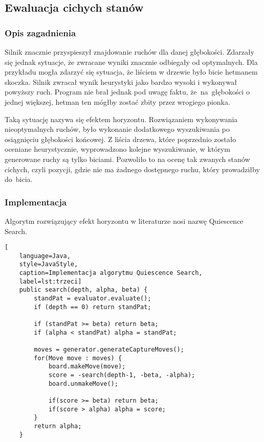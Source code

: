 \subsection{Ewaluacja cichych stanów}
\label{subsec:ewaluacja-cichych-stanow}

\subsubsection{Opis zagadnienia}
Silnik znacznie przyspieszył znajdowanie ruchów dla danej głębokości.
Zdarzały się jednak sytuacje, że zwracane wyniki znacznie odbiegały od optymalnych.
Dla przykładu mogła zdarzyć się sytuacja, że liściem w drzewie było bicie hetmanem skoczka.
Silnik zwracał wynik heurystyki jako bardzo wysoki i wykonywał powyższy ruch.
Program nie brał jednak pod uwagę faktu, że~na~głębokości o jednej większej, hetman ten mógłby zostać zbity przez wrogiego pionka.

Taką sytuację nazywa się efektem horyzontu.
Rozwiązaniem wykonywania nieoptymalnych ruchów, było wykonanie dodatkowego wyszukiwania po osiągnięciu głębokości końcowej.
Z liścia drzewa, które poprzednio zostało oceniane heurystycznie, wyprowadzono kolejne wyszukiwanie, w którym generowane ruchy są tylko biciami.
Pozwoliło to na ocenę tak zwanych stanów cichych, czyli pozycji, gdzie nie ma żadnego dostępnego ruchu, który prowadziłby do~bicia.

\subsubsection{Implementacja}

Algorytm rozwiązujący efekt horyzontu w literaturze nosi nazwę Quiescence Search.

\begin{lstlisting}[
    language=Java,
    style=JavaStyle,
    caption=Implementacja algorytmu Quiescence Search,
    label=lst:trzeci]
    public search(depth, alpha, beta) {
        standPat = evaluator.evaluate();
        if (depth == 0) return standPat;

        if (standPat >= beta) return beta;
        if (alpha < standPat) alpha = standPat;

        moves = generator.generateCaptureMoves();
        for(Move move : moves) {
            board.makeMove(move);
            score = -search(depth-1, -beta, -alpha);
            board.unmakeMove();

            if(score >= beta) return beta;
            if(score > alpha) alpha = score;
        }
        return alpha;
    }
\end{lstlisting}

